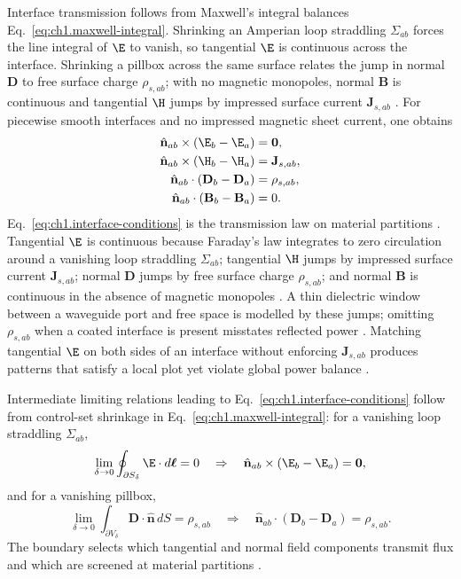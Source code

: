 Interface transmission follows from Maxwell's integral balances
Eq.~\eqref{eq:ch1.maxwell-integral}. Shrinking an Amperian loop straddling
\(\Sigma_{ab}\) forces the line integral of \(\E\) to vanish, so tangential
\(\E\) is continuous across the interface. Shrinking a pillbox across the same
surface relates the jump in normal \(\mathbf{D}\) to free surface charge
\(\rho_{s,ab}\); with no magnetic monopoles, normal \(\mathbf{B}\) is continuous
and tangential \(\H\) jumps by impressed surface current \(\mathbf{J}_{s,ab}\)
\cite{maxwell1873,jackson1999}. For piecewise smooth interfaces and no impressed magnetic
sheet current, one obtains
\begin{equation}
\label{eq:ch1.interface-conditions}
\begin{aligned}
\hat{\mathbf{n}}_{ab}\times(\E_b-\E_a)&=\mathbf{0},\\
\hat{\mathbf{n}}_{ab}\times(\H_b-\H_a)&=\mathbf{J}_{s,ab},\\
\hat{\mathbf{n}}_{ab}\cdot(\mathbf{D}_b-\mathbf{D}_a)&=\rho_{s,ab},\\
\hat{\mathbf{n}}_{ab}\cdot(\mathbf{B}_b-\mathbf{B}_a)&=0.
\end{aligned}
\end{equation}
Eq.~\eqref{eq:ch1.interface-conditions} is the transmission law on material partitions \cite{stratton1941}. Tangential $\E$ is continuous because Faraday's law integrates to zero circulation around a vanishing loop straddling $\Sigma_{ab}$; tangential $\H$ jumps by impressed surface current $\mathbf{J}_{s,ab}$; normal $\mathbf{D}$ jumps by free surface charge $\rho_{s,ab}$; and normal $\mathbf{B}$ is continuous in the absence of magnetic monopoles \cite{jackson1999}. A thin dielectric window between a waveguide port and free space is modelled by these jumps; omitting $\rho_{s,ab}$ when a coated interface is present misstates reflected power \cite{collin2001}. Matching tangential $\E$ on both sides of an interface without enforcing $\mathbf{J}_{s,ab}$ produces patterns that satisfy a local plot yet violate global power balance \cite{stratton1941}.

Intermediate limiting relations leading to Eq.~\eqref{eq:ch1.interface-conditions}
follow from control-set shrinkage in Eq.~\eqref{eq:ch1.maxwell-integral}:
for a vanishing loop straddling \(\Sigma_{ab}\),
\[
\lim_{\delta\to 0}\oint_{\partial S_\delta}\E\cdot d\boldsymbol{\ell}=0
\quad\Rightarrow\quad
\hat{\mathbf{n}}_{ab}\times(\E_b-\E_a)=\mathbf{0},
\]
and for a vanishing pillbox,
\[
\lim_{\delta\to 0}\int_{\partial V_\delta}\mathbf{D}\cdot\hat{\mathbf{n}}\,dS
=\rho_{s,ab}
\quad\Rightarrow\quad
\hat{\mathbf{n}}_{ab}\cdot(\mathbf{D}_b-\mathbf{D}_a)=\rho_{s,ab}.
\]
The boundary selects which tangential and normal field components transmit flux and which are screened at material partitions \cite{stratton1941}.

